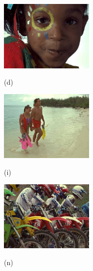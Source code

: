 \begin{figure}[!]
		\begin{minipage}[t]{.32\linewidth}
			\includegraphics[width=1.8in]{TID/i15_14_5.jpg}
			\centerline{(d)}
		\end{minipage}
		\begin{minipage}[t]{.32\linewidth}
			\includegraphics[width=1.8in]{TID/i12_14_5.jpg}
			\centerline{(i)}
		\end{minipage}
		\begin{minipage}[t]{.32\linewidth}
			\includegraphics[width=1.8in]{TID/i05_14_5.jpg}
			\centerline{(n)}
		\end{minipage}
	

\end{figure}
